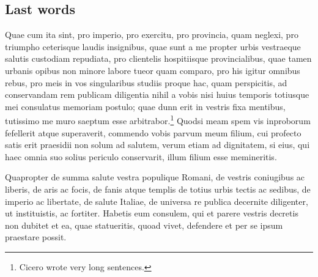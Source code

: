 \documentclass[letterpaper]{ifacmtg}
\begin{document}
\subsection{Last words}
 Quae cum ita sint, pro imperio, pro exercitu, pro provincia, quam
neglexi, pro triumpho ceterisque laudis insignibus, quae sunt a me
propter urbis vestraeque salutis custodiam repudiata, pro clientelis
hospitiisque provincialibus, quae tamen urbanis opibus non minore labore
tueor quam comparo, pro his igitur omnibus rebus, pro meis in vos
singularibus studiis proque hac, quam perspicitis, ad conservandam rem
publicam diligentia nihil a vobis nisi huius temporis totiusque mei
consulatus memoriam postulo; quae dunn erit in vestris fixa mentibus,
tutissimo me muro saeptum esse arbitrabor.\footnote{Cicero wrote very
  long sentences.} Quodsi meam spem vis
inproborum fefellerit atque superaverit, commendo vobis parvum meum
filium, cui profecto satis erit praesidii non solum ad salutem, verum
etiam ad dignitatem, si eius, qui haec omnia suo solius periculo
conservarit, illum filium esse memineritis. \par Quapropter de summa salute
vestra populique Romani, de vestris coniugibus ac liberis, de aris ac
focis, de fanis atque templis de totius urbis tectis ac sedibus, de
imperio ac libertate, de salute Italiae, de universa re publica
decernite diligenter, ut instituistis, ac fortiter. Habetis eum
consulem, qui et parere vestris decretis non dubitet et ea, quae
statueritis, quoad vivet, defendere et per se ipsum praestare possit.



\end{document}

